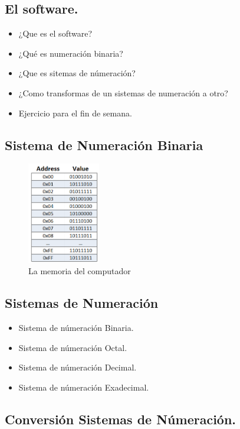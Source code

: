 \documentclass[presentation, aspectratio=54]{beamer}
\begin{document}
\subsection{El software.}
\label{sec:org5da7a19}
\begin{itemize}
\item ¿Que es el software?
\item ¿Qué es numeración binaria?
\item ¿Que es sitemas de númeración?
\item ¿Como transformas de un sistemas de numeración a otro?
\item Ejercicio para el fin de semana.
\end{itemize}


\subsection{Sistema de Numeración Binaria}
\label{sec:orge8f2d3a}

\begin{figure}[htbp]
\centering
\includegraphics[width=120px]{./images/memoria.png}
\caption{La memoria del computador}
\end{figure}

\subsection{Sistemas de Numeración}
\label{sec:orga7b6a56}
\begin{itemize}
\item Sistema de númeración Binaria.
\item Sistema de númeración Octal.
\item Sistema de númeración Decimal.
\item Sistema de númeración Exadecimal.
\end{itemize}

\subsection{Conversión Sistemas de Númeración.}
\label{sec:org25c1c22}
\end{document}
